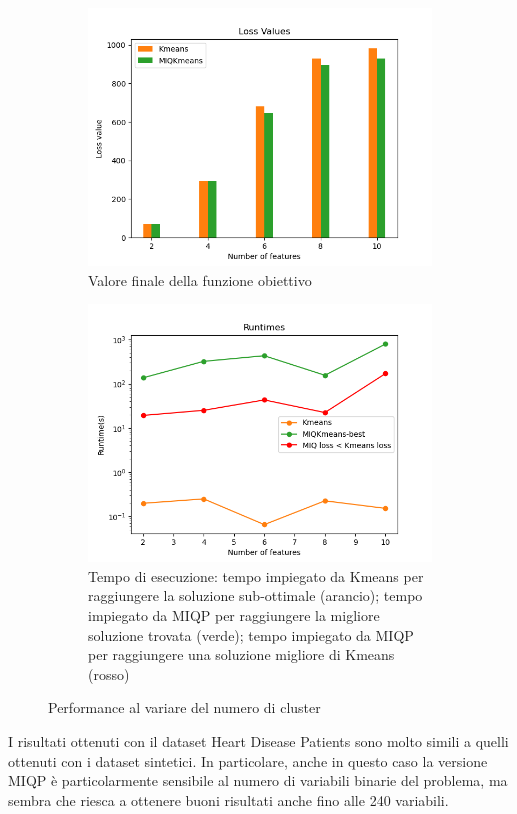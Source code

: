 \documentclass{article}
\begin{document}
    \begin{figure}[H]
     \centering
     \begin{subfigure}[t]{0.49\linewidth}
         \centering
         \includegraphics[width=\linewidth]{../results/log_plots/loss_features_heart}
         \caption{Valore finale della funzione obiettivo}
     \end{subfigure}
     \hfill
     \begin{subfigure}[t]{0.49\linewidth}
         \centering
         \includegraphics[width=\linewidth]{../results/log_plots/runtime_features_heart_log}
         \caption{Tempo di esecuzione: tempo impiegato da Kmeans per raggiungere la soluzione sub-ottimale (arancio); tempo impiegato da MIQP per raggiungere la migliore soluzione trovata (verde); tempo impiegato da MIQP per raggiungere una soluzione migliore di Kmeans (rosso)}
     \end{subfigure}
        \caption{Performance al variare del numero di cluster}
        \label{fig:f_real}
     \end{figure}
    I risultati ottenuti con il dataset Heart Disease Patients sono molto simili a quelli ottenuti con i dataset sintetici. In particolare, anche in questo caso la versione MIQP è particolarmente sensibile al numero di variabili binarie del problema, ma sembra che riesca a ottenere buoni risultati anche fino alle 240 variabili.
\end{document}
